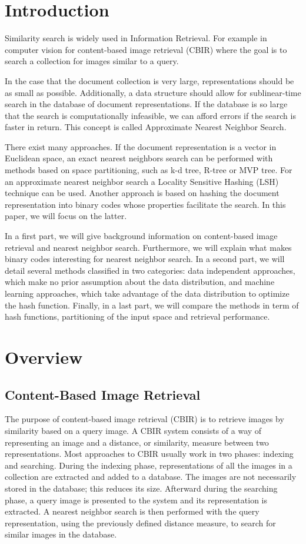 \section{Introduction}
Similarity search is widely used in Information Retrieval. For example in computer vision for content-based image retrieval (CBIR) where the goal is to search a collection for images similar to a query.

In the case that the document collection is very large, representations should be as small as possible. Additionally, a data structure should allow for sublinear-time search in the database of document representations. If the database is so large that the search is computationally infeasible, we can afford errors if the search is faster in return. This concept is called Approximate Nearest Neighbor Search.

There exist many approaches. If the document representation is a vector in Euclidean space, an exact nearest neighbors search can be performed with methods based on space partitioning, such as k-d tree, R-tree or MVP tree. For an approximate nearest neighbor search a Locality Sensitive Hashing (LSH) technique can be used. Another approach is based on hashing the document representation into binary codes whose properties facilitate the search. In this paper, we will focus on the latter.

In a first part, we will give background information on content-based image retrieval and nearest neighbor search. Furthermore, we will explain what makes binary codes interesting for nearest neighbor search. In a second part, we will detail several methods classified in two categories: data independent approaches, which make no prior assumption about the data distribution, and machine learning approaches, which take advantage of the data distribution to optimize the hash function. Finally, in a last part, we will compare the methods in term of hash functions, partitioning of the input space and retrieval performance.

\section{Overview}

\subsection{Content-Based Image Retrieval}
The purpose of content-based image retrieval (CBIR) is to retrieve images by similarity based on a query image. A CBIR system consists of a way of representing an image and a distance, or similarity, measure between two representations. Most approaches to CBIR usually work in two phases: indexing and searching. During the indexing phase, representations of all the images in a collection are extracted and added to a database. The images are not necessarily stored in the database; this reduces its size. Afterward during the searching phase, a query image is presented to the system and its representation is extracted. A nearest neighbor search is then performed with the query representation, using the previously defined distance measure, to search for similar images in the database.

